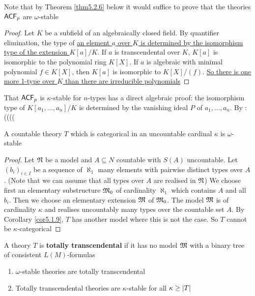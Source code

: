 \documentclass[11pt]{article}
\begin{document}
Note that by Theorem \ref{thm5.2.6} below it would suffice to prove that the theories \(\textsf{ACF}_p\)
are \(\omega\)-stable

\begin{proof}
\label{Problem1}
Let \(K\) be a subfield of an algebraically closed field. By quantifier elimination, the type of
\uline{an element \(a\) over \(K\) is determined by the isomorphism type of the extension \(K[a]/K\)}.
If \(a\) is transcendental over \(K\), \(K[a]\) is isomorphic to the polynomial ring \(K[X]\).
If \(a\) is algebraic with minimal polynomial \(f\in K[X]\), then \(K[a]\) is isomorphic
to \(K[X]/(f)\). \uline{So there is one more 1-type over \(K\) than there are irreducible polynomials}
\end{proof}

That \(\textsf{ACF}_p\) is \(\kappa\)-stable for \(n\)-types has a direct algebraic proof: the isomorphism type
of \(K[a_1,\dots,a_n]/K\) is determined by the vanishing ideal \(P\) of \(a_1,\dots,a_n\). By :((((

\begin{theorem}[]
\label{thm5.2.4}
A countable theory \(T\) which is categorical in an uncountable cardinal \(\kappa\) is \(\omega\)-stable
\end{theorem}

\begin{proof}
Let \(\mathfrak{N}\) be a model and \(A\subseteq N\) countable with \(S(A)\) uncountable. Let \((b_i)_{i\in I}\) be a
sequence of \(\aleph_1\) many elements with pairwise distinct types over \(A\). (Note that we can
assume that all types over \(A\) are realised in \(\mathfrak{N}\)) We choose first an elementary
substructure \(\mathfrak{M}_0\) of cardinality \(\aleph_1\) which contains \(A\) and all \(b_i\). Then we choose an
elementary extension \(\mathfrak{M}\) of \(\mathfrak{M}_0\). The model \(\mathfrak{M}\) is of cardinality \(\kappa\) and realises
uncountably many types over the countable set \(A\). By Corollary \ref{cor5.1.9}, \(T\) has another
model where this is not the case. So \(T\) cannot be \(\kappa\)-categorical
\end{proof}

\begin{definition}[]
A theory \(T\) is \textbf{totally transcendental} if it has no model \(\mathfrak{M}\) with a binary tree of
consistent \(L(M)\)-formulas
\end{definition}

\begin{theorem}[]
\label{thm5.2.6}
\begin{enumerate}
\item \(\omega\)-stable theories are totally transcendental
\item Totally transcendental theories are \(\kappa\)-stable for all \(\kappa\ge\abs{T}\)
\end{enumerate}
\end{theorem}
\end{document}
